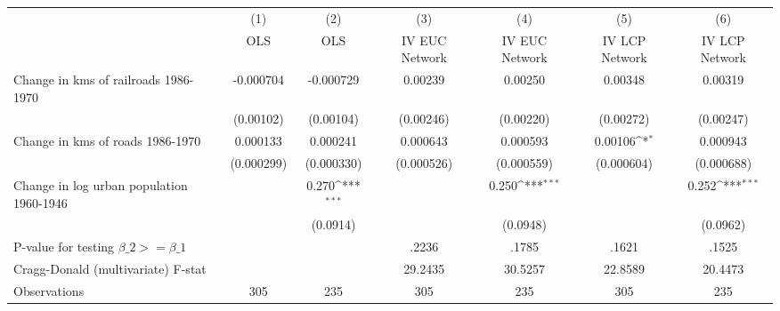 {
\def\sym#1{\ifmmode^{#1}\else\(^{#1}\)\fi}
\begin{tabular}{l*{6}{c}}
\hline\hline
                &\multicolumn{1}{c}{(1)}&\multicolumn{1}{c}{(2)}&\multicolumn{1}{c}{(3)}&\multicolumn{1}{c}{(4)}&\multicolumn{1}{c}{(5)}&\multicolumn{1}{c}{(6)}\\
                &\multicolumn{1}{c}{OLS}&\multicolumn{1}{c}{OLS}&\multicolumn{1}{c}{IV EUC Network}&\multicolumn{1}{c}{IV EUC Network}&\multicolumn{1}{c}{IV LCP Network}&\multicolumn{1}{c}{IV LCP Network}\\
\hline
Change in kms of railroads 1986-1970&-0.000704         &-0.000729         &  0.00239         &  0.00250         &  0.00348         &  0.00319         \\
                &(0.00102)         &(0.00104)         &(0.00246)         &(0.00220)         &(0.00272)         &(0.00247)         \\
[1em]
Change in kms of roads 1986-1970& 0.000133         & 0.000241         & 0.000643         & 0.000593         &  0.00106\sym{*}  & 0.000943         \\
                &(0.000299)         &(0.000330)         &(0.000526)         &(0.000559)         &(0.000604)         &(0.000688)         \\
[1em]
Change in log urban population 1960-1946&                  &    0.270\sym{***}&                  &    0.250\sym{***}&                  &    0.252\sym{***}\\
                &                  & (0.0914)         &                  & (0.0948)         &                  & (0.0962)         \\
\hline
P-value for testing $\beta\_{2} >= \beta\_{1}$&                  &                  &    .2236         &    .1785         &    .1621         &    .1525         \\
Cragg-Donald (multivariate) F-stat&                  &                  &  29.2435         &  30.5257         &  22.8589         &  20.4473         \\
Observations    &      305         &      235         &      305         &      235         &      305         &      235         \\
\hline\hline
\end{tabular}
}
